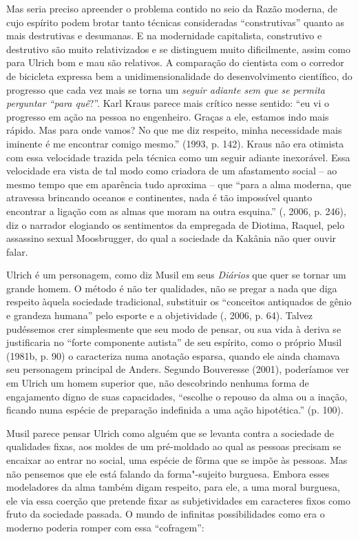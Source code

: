 Mas seria preciso apreender o problema contido no seio da Razão moderna,
de cujo espírito podem brotar tanto técnicas consideradas
``construtivas'' quanto as mais destrutivas e desumanas. E na
modernidade capitalista, construtivo e destrutivo são muito
relativizados e se distinguem muito dificilmente, assim como para Ulrich
bom e mau são relativos. A comparação do cientista com o corredor de
bicicleta expressa bem a unidimensionalidade do desenvolvimento
científico, do progresso que cada vez mais se torna um \emph{seguir
adiante sem que se permita perguntar ``para quê}?''. Karl Kraus parece
mais crítico nesse sentido: ``eu vi o progresso em ação na pessoa no
engenheiro. Graças a ele, estamos indo mais rápido. Mas para onde vamos?
No que me diz respeito, minha necessidade mais iminente é me encontrar
comigo mesmo.'' (1993, p. 142). Kraus não era otimista com essa
velocidade trazida pela técnica como um seguir adiante inexorável. Essa
velocidade era vista de tal modo como criadora de um afastamento social
-- ao mesmo tempo que em aparência tudo aproxima -- que ``para a alma
moderna, que atravessa brincando oceanos e continentes, nada é tão
impossível quanto encontrar a ligação com as almas que moram na outra
esquina.'' (, 2006, p. 246), diz o narrador elogiando os
sentimentos da empregada de Diotima, Raquel, pelo assassino sexual
Moosbrugger, do qual a sociedade da Kakânia não quer ouvir falar.

Ulrich é um personagem, como diz Musil em seus \emph{Diários} que quer
se tornar um grande homem. O método é não ter qualidades, não se pregar
a nada que diga respeito àquela sociedade tradicional, substituir os
``conceitos antiquados de gênio e grandeza humana'' pelo esporte e a
objetividade (, 2006, p. 64). Talvez pudéssemos crer simplesmente
que seu modo de pensar, ou sua vida à deriva se justificaria no ``forte
componente autista'' de seu espírito, como o próprio Musil (1981b, p.
90) o caracteriza numa anotação esparsa, quando ele ainda chamava seu
personagem principal de Anders. Segundo Bouveresse (2001), poderíamos
ver em Ulrich um homem superior que, não descobrindo nenhuma forma de
engajamento digno de suas capacidades, ``escolhe o repouso da alma ou a
inação, ficando numa espécie de preparação indefinida a uma ação
hipotética.'' (p. 100).

Musil parece pensar Ulrich como alguém que se levanta contra a sociedade
de qualidades fixas, aos moldes de um pré-moldado ao qual as pessoas
precisam se encaixar ao entrar no social, uma espécie de fôrma que se
impõe às pessoas. Mas não pensemos que ele está falando da forma"-sujeito
burguesa. Embora esses modeladores da alma também digam respeito, para
ele, a uma moral burguesa, ele via essa coerção que pretende fixar as
subjetividades em caracteres fixos como fruto da sociedade passada. O
mundo de infinitas possibilidades como era o moderno poderia romper com
essa ``cofragem'':

